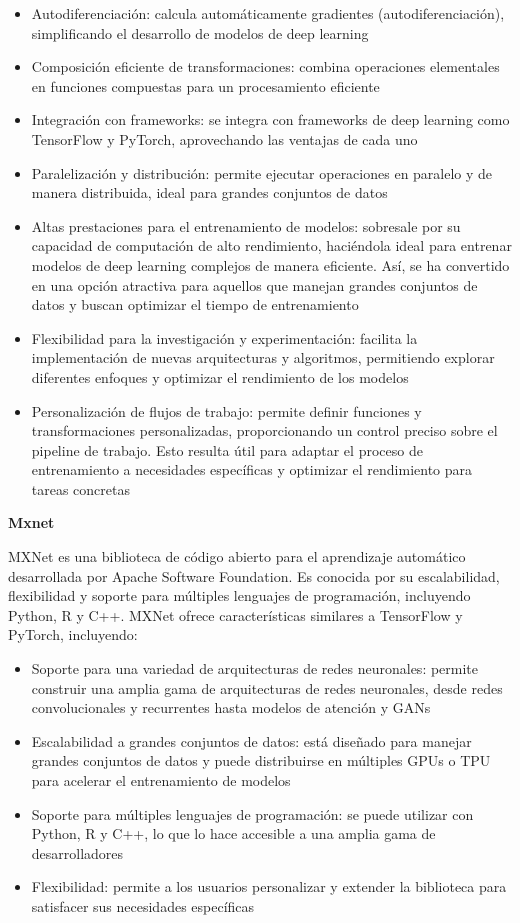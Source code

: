 \documentclass[
  a4paper,
  DIV=11,
  numbers=noendperiod]{scrreprt}
\providecommand{\tightlist}{%
  \setlength{\itemsep}{0pt}\setlength{\parskip}{0pt}}\usepackage{longtable,booktabs,array}
\begin{document}
\begin{itemize}
\tightlist
\item
  Autodiferenciación: calcula automáticamente gradientes
  (autodiferenciación), simplificando el desarrollo de modelos de deep
  learning
\item
  Composición eficiente de transformaciones: combina operaciones
  elementales en funciones compuestas para un procesamiento eficiente
\item
  Integración con frameworks: se integra con frameworks de deep learning
  como TensorFlow y PyTorch, aprovechando las ventajas de cada uno
\item
  Paralelización y distribución: permite ejecutar operaciones en
  paralelo y de manera distribuida, ideal para grandes conjuntos de
  datos
\item
  Altas prestaciones para el entrenamiento de modelos: sobresale por su
  capacidad de computación de alto rendimiento, haciéndola ideal para
  entrenar modelos de deep learning complejos de manera eficiente. Así,
  se ha convertido en una opción atractiva para aquellos que manejan
  grandes conjuntos de datos y buscan optimizar el tiempo de
  entrenamiento
\item
  Flexibilidad para la investigación y experimentación: facilita la
  implementación de nuevas arquitecturas y algoritmos, permitiendo
  explorar diferentes enfoques y optimizar el rendimiento de los modelos
\item
  Personalización de flujos de trabajo: permite definir funciones y
  transformaciones personalizadas, proporcionando un control preciso
  sobre el pipeline de trabajo. Esto resulta útil para adaptar el
  proceso de entrenamiento a necesidades específicas y optimizar el
  rendimiento para tareas concretas
\end{itemize}

\textbf{Mxnet}

MXNet es una biblioteca de código abierto para el aprendizaje automático
desarrollada por Apache Software Foundation. Es conocida por su
escalabilidad, flexibilidad y soporte para múltiples lenguajes de
programación, incluyendo Python, R y C++. MXNet ofrece características
similares a TensorFlow y PyTorch, incluyendo:

\begin{itemize}
\tightlist
\item
  Soporte para una variedad de arquitecturas de redes neuronales:
  permite construir una amplia gama de arquitecturas de redes
  neuronales, desde redes convolucionales y recurrentes hasta modelos de
  atención y GANs
\item
  Escalabilidad a grandes conjuntos de datos: está diseñado para manejar
  grandes conjuntos de datos y puede distribuirse en múltiples GPUs o
  TPU para acelerar el entrenamiento de modelos
\item
  Soporte para múltiples lenguajes de programación: se puede utilizar
  con Python, R y C++, lo que lo hace accesible a una amplia gama de
  desarrolladores
\item
  Flexibilidad: permite a los usuarios personalizar y extender la
  biblioteca para satisfacer sus necesidades específicas
\end{itemize}
\end{document}
